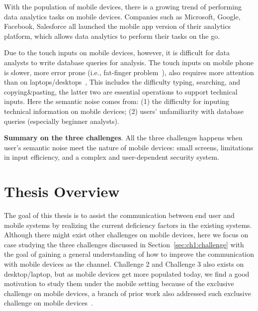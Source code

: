 With the population of mobile devices, there is a growing trend of performing data analytics tasks on mobile devices. Companies such as Microsoft, Google, Facebook, Salesforce all launched the mobile app version of their analytics platform, which allows data analytics to perform their tasks on the go. 

Due to the touch inputs on mobile devices, however, it is difficult for data analysts to write database queries for analysis. The touch inputs on mobile phone is slower, more error prone (i.e., fat-finger problem~\cite{siek2005fat}), also requires more attention than on laptops/desktops~\cite{mobiletyping}, This includes the difficulty typing, searching, and copying\&pasting, the latter two are essential operations to support technical inputs. Here the semantic noise comes from: (1) the difficulty for inputing technical information on mobile devices; (2) users' unfamiliarity with database queries (especially beginner analysts). 

\textbf{ Summary on the three challenges}. All the three challenges happens when user's semantic noise meet the nature of mobile devices: small screens, limitations in input efficiency, and a complex and user-dependent security system. 

\section{Thesis Overview}

The goal of this thesis is to assist the communication between end user and mobile systems by realizing the current deficiency factors in the existing systems. Although there might exist other challenges on mobile devices, here we focus on case studying the three challenges discussed in Section~\ref{sec:ch1:challenge} with the goal of gaining a general understanding of how to improve the communication with mobile devices as the channel. Challenge 2 and Challenge 3 also exists on desktop/laptop, but as mobile devices get more populated today, we find a good motivation to study them under the mobile setting because of the exclusive challenge on mobile devices, a branch of prior work also addressed such exclusive challenge on mobile devices~\cite{popescu2003towards,zhang2017information}. 

